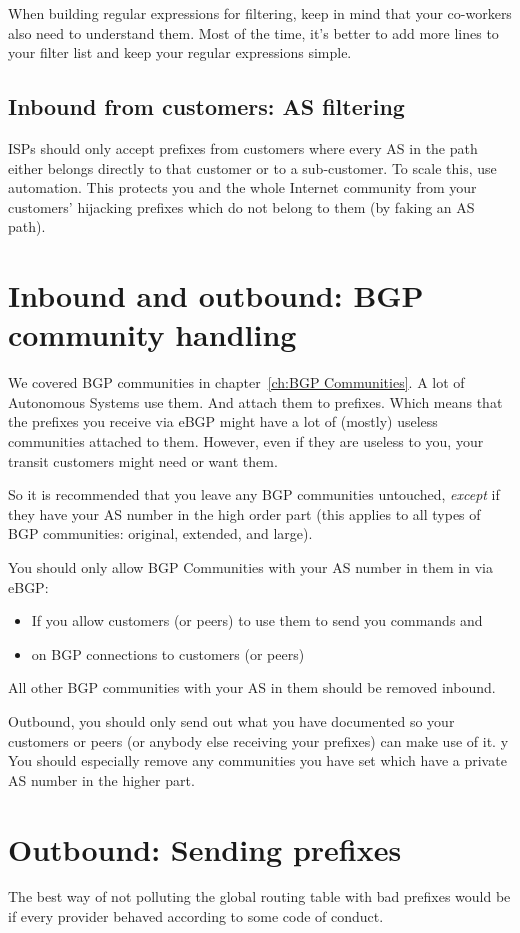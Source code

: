 When building regular expressions for filtering, keep in mind that your co-workers also need to understand them. Most of the time, it's better to add more lines to your filter list and keep your regular expressions simple.

\subsection{Inbound from customers: AS filtering}
ISPs should only accept prefixes from customers where every AS in the path either belongs directly to that customer or to a sub-customer. To scale this, use automation. This protects you and the whole Internet community from your customers' hijacking prefixes which do not belong to them (by faking an AS path).

\section{Inbound and outbound: BGP community handling}
We covered BGP communities in chapter~\ref{ch:BGP Communities}. A lot of Autonomous Systems use them. And attach them to prefixes. Which means that the prefixes you receive via eBGP might have a lot of (mostly) useless communities attached to them. However, even if they are useless to you, your transit customers might need or want them.

So it is recommended that you leave any BGP communities untouched, \emph{except} if they have your AS number in the high order part (this applies to all types of BGP communities: original, extended, and large).

You should only allow BGP Communities with your AS number in them in via eBGP:
\begin{itemize}
  \item If you allow customers (or peers) to use them to send you commands and
  \item on BGP connections to customers (or peers)
\end{itemize}

All other BGP communities with your AS in them should be removed inbound.

Outbound, you should only send out what you have documented so your customers or peers (or anybody else receiving your prefixes) can make use of it.  y
You should especially remove any communities you have set which have a private AS number in the higher part.

\section{Outbound: Sending prefixes}
The best way of not polluting the global routing table with bad prefixes would be if every provider behaved according to some code of conduct.

